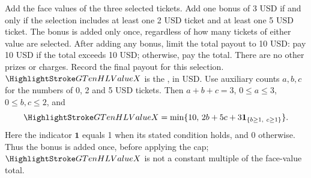 Add the face values of the three selected tickets. Add one bonus of 3 USD if and only if the selection includes at least one 2 USD ticket and at least one 5 USD ticket. The bonus is added only once, regardless of how many tickets of either value are selected. After adding any bonus, limit the total payout to 10 USD: pay 10 USD if the total exceeds 10 USD; otherwise, pay the total. There are no other prizes or charges. Record the final payout for this selection.
$\cTwoValue{X}$ is the , in USD. Use auxiliary counts $a,b,c$ for the numbers of 0, 2 and 5 USD tickets. Then $a+b+c=3$, $0\leq a\leq3$, $0\leq b,c\leq2$, and
\[
\cTwoValue{X}=\min\{10,\,2b+5c+3\mathbf{1}_{\{b\geq1,\ c\geq1\}}\}.
\]
Here the indicator $\mathbf{1}$ equals 1 when its stated condition holds, and 0 otherwise. Thus the bonus is added once, before applying the cap; $\cTwoValue{X}$ is not a constant multiple of the face-value total.

